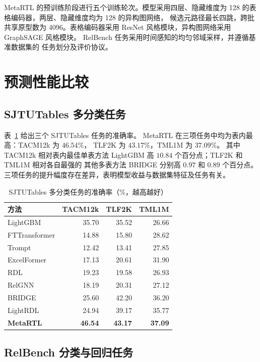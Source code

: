 MetaRTL 的预训练阶段进行五个训练轮次。模型采用四层、隐藏维度为
128 的表格编码器，两层、隐藏维度均为 128 的异构图网络，
候选元路径最长四跳，跨批共享原型数为 4096。表格编码器采用
ResNet 风格模块，异构图网络采用 GraphSAGE 风格模块。
RelBench 任务采用时间感知的均匀邻域采样，并遵循基准数据集的
任务划分及评价协议。

\section{预测性能比较}
\label{sec:metartl-results}

\subsection{SJTUTables 多分类任务}

表~\ref{tab:metartl-sjtu} 给出三个 SJTUTables 任务的准确率。
MetaRTL 在三项任务中均为表内最高：TACM12k 为 $46.54\%$，
TLF2K 为 $43.17\%$，TML1M 为 $37.09\%$。
其中 TACM12k 相对表内最佳单表方法 LightGBM 高
$10.84$ 个百分点；TLF2K 和 TML1M 相对各自最强的
其他多表方法 BRIDGE 分别高 $0.97$ 和 $0.89$ 个百分点。
三项任务的提升幅度存在差异，表明模型收益与数据集特征及任务有关。

\begin{table}[htbp]
  \centering
  \caption{SJTUTables 多分类任务的准确率（\%，越高越好）}
  \label{tab:metartl-sjtu}
  \begin{tabular}{lrrr}
    \toprule
    方法 & TACM12k & TLF2K & TML1M \\
    \midrule
    LightGBM     & 35.70 & 35.52 & 26.66 \\
    FTTransformer & 14.88 & 15.80 & 28.62 \\
    Trompt       & 12.42 & 13.41 & 27.85 \\
    ExcelFormer  & 17.13 & 20.61 & 31.90 \\
    RDL          & 19.23 & 19.58 & 26.93 \\
    RelGNN       & 18.19 & 20.31 & 27.12 \\
    BRIDGE       & 25.60 & 42.20 & 36.20 \\
    LightRDL     & 24.94 & 39.17 & 35.77 \\
    \textbf{MetaRTL} & \textbf{46.54} & \textbf{43.17} & \textbf{37.09} \\
    \bottomrule
  \end{tabular}
\end{table}

\subsection{RelBench 分类与回归任务}

